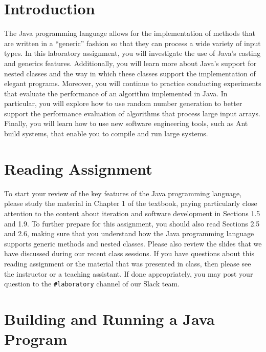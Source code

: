 

\usepackage[compact]{titlesec}



\section*{Introduction}

The Java programming language allows for the implementation of methods that are written in a ``generic'' fashion so that
they can process a wide variety of input types. In this laboratory assignment, you will investigate the use of Java's
casting and generics features. Additionally, you will learn more about Java's support for nested classes and the way in
which these classes support the implementation of elegant programs. Moreover, you will continue to practice conducting
experiments that evaluate the performance of an algorithm implemented in Java. In particular, you will explore how to
use random number generation to better support the performance evaluation of algorithms that process large input arrays.
Finally, you will learn how to use new software engineering tools, such as Ant build systems, that enable you to compile
and run large systems.

\section*{Reading Assignment}

To start your review of the key features of the Java programming language, please study the material in Chapter 1 of the
textbook, paying particularly close attention to the content about iteration and software development in Sections 1.5
and 1.9. To further prepare for this assignment, you should also read Sections 2.5 and 2.6, making sure that you
understand how the Java programming language supports generic methods and nested classes.  Please also review the slides
that we have discussed during our recent class sessions. If you have questions about this reading assignment or the
material that was presented in class, then please see the instructor or a teaching assistant. If done appropriately, you
may post your question to the {\tt \#laboratory} channel of our Slack team.

\section*{Building and Running a Java Program}

